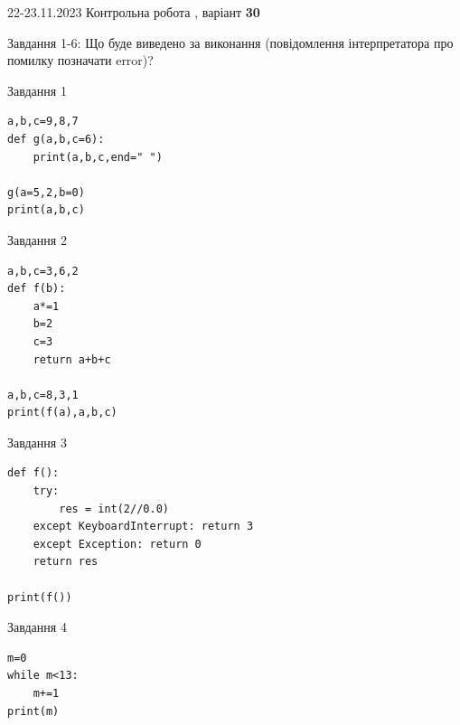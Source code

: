 \documentclass[12pt, ukrainian]{article}
\begin{document}
{{22-23.11.2023 Контрольна робота , варіант  \No \textbf { 30 }\par}}
{

Завдання 1-6: Що буде виведено за виконання (повідомлення інтерпретатора про помилку позначати error)?


\begin{minipage}[t]{9.7cm}                
{\begin{center}Завдання {1}\end{center}}
\begin{verbatim}
a,b,c=9,8,7
def g(a,b,c=6):
    print(a,b,c,end=" ")

g(a=5,2,b=0)
print(a,b,c)
\end{verbatim}     
\end{minipage}
\vline \hspace{8mm}
\begin{minipage}[t]{8.0cm}                
{\begin{center}Завдання {2}\end{center}}
\begin{verbatim}
a,b,c=3,6,2
def f(b):
    a*=1
    b=2
    c=3
    return a+b+c

a,b,c=8,3,1
print(f(a),a,b,c)
\end{verbatim}     
\end{minipage}

\vspace{15mm}
\begin{minipage}[t]{9.7cm}                
{\begin{center}Завдання {3}\end{center}}
\begin{verbatim}
def f():
    try:
        res = int(2//0.0)
    except KeyboardInterrupt: return 3
    except Exception: return 0
    return res

print(f())
\end{verbatim}     
\end{minipage}
\vline \hspace{8mm}
\begin{minipage}[t]{8.0cm}                
{\begin{center}Завдання {4}\end{center}}
\begin{verbatim}
m=0
while m<13:
    m+=1
print(m)
\end{verbatim}     
\end{minipage}

}
\end{document}
